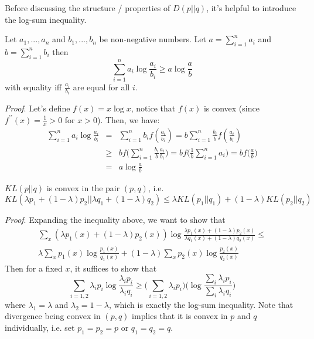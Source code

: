 Before discussing the structure / properties of $D(p||q)$, it's helpful to introduce the log-sum inequality.
\begin{theorem}
Let $a_1,...,a_n$ and $b_1,...,b_n$ be non-negative numbers. Let $a = \sum_{i=1}^{n}a_i$ and $b = \sum_{i=1}^{n}b_i$ then
\begin{equation}
    \sum_{i=1}^{n}a_i\log \frac{a_i}{b_i} \geq a \log \frac{a}{b}
\end{equation}
with equality iff $\frac{a_i}{b_i}$ are equal for all $i$.
\end{theorem}
\textit{Proof}. Let's define $f(x) = x\log x$, notice that $f(x)$ is convex (since $f^{\prime \prime}(x) = \frac{1}{x} > 0$ for $x > 0$). Then, we have:
\begin{eqnarray}
    \sum_{i=1}^{n} a_i \log \frac{a_i}{b_i} &=& \sum_{i=1}^{n}b_i f(\frac{a_i}{b_i}) = b \sum_{i=1}^{n}\frac{b_i}{b}f(\frac{a_i}{b_i}) \\ \nonumber
    &\geq& bf\bigg(\sum_{i=1}^{n}\frac{b_i}{b}\frac{a_i}{b_i}\bigg) = bf\bigg(\frac{1}{b}\sum_{i=1}^{n}a_i \bigg) = bf\big(\frac{a}{b}\big) \\ \nonumber 
    &=& a \log \frac{a}{b}
\end{eqnarray}

\begin{theorem}
   $KL(p||q)$ is convex in the pair $(p,q)$, i.e.
   \begin{equation}
        KL(\lambda p_1 + (1-\lambda)p_2 || \lambda q_1 + (1-\lambda) q_2) \leq \lambda KL(p_1||q_1) + (1-\lambda) KL(p_2||q_2)
   \end{equation}
\end{theorem}
\textit{Proof}. Expanding the inequality above, we want to show that
\begin{eqnarray}
\sum_x(\lambda p_1(x) + (1-\lambda)p_2(x))\log\frac{\lambda p_1(x) + (1-\lambda)p_2(x)}{\lambda q_1(x) + (1-\lambda)q_2(x)} \leq \\
\lambda \sum_x p_1(x)\log\frac{p_1(x)}{q_1(x)} + (1-\lambda)\sum_x p_2(x)\log\frac{p_2(x)}{q_2(x)}
\end{eqnarray}
Then for a fixed $x$, it suffices to show that
\begin{equation}
    \sum_{i=1,2} \lambda_i p_i \log \frac{\lambda_i p_i}{\lambda_i q_i} \geq \bigg(\sum_{i=1,2}\lambda_i p_i \bigg)\bigg(\log \frac{\sum_i \lambda_i p_i}{\sum_i \lambda_i q_i} \bigg)
\end{equation}
where $\lambda_1 = \lambda$ and $\lambda_2 = 1-\lambda$, which is exactly the log-sum inequality. Note that divergence being convex in $(p, q)$ implies that it is convex in $p$ and $q$ individually, i.e. set $p_1 = p_2 = p$ or $q_1 = q_2 = q$.\\ 

